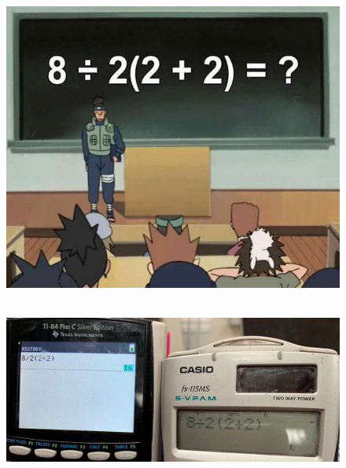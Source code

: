 \documentclass[11pt]{article}
\begin{document}
\begin{minipage}[t]{0.5\textwidth}
  \begin{figure}[H]
        \centering
        \includegraphics[width=0.7\linewidth]{5x1-calculer/naruto.png}
  \end{figure}
\end{minipage}
\begin{minipage}[t]{0.5\textwidth}
  \begin{figure}[H]
        \centering
        \includegraphics[width=\linewidth]{5x1-calculer/calc.png}
  \end{figure}
\end{minipage}
\end{document}
